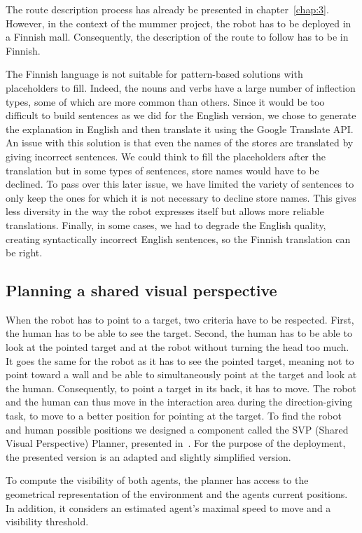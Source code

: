 The route description process has already be presented in chapter~\ref{chap:3}. However, in the context of the \acrshort{mummer} project, the robot has to be deployed in a Finnish mall. Consequently, the description of the route to follow has to be in Finnish.

The Finnish language is not suitable for pattern-based solutions with placeholders to fill. Indeed, the nouns and verbs have a large number of inflection types, some of which are more common than others. Since it would be too difficult to build sentences as we did for the English version, we chose to generate the explanation in English and then translate it using the Google Translate API. An issue with this solution is that even the names of the stores are translated by giving incorrect sentences. We could think to fill the placeholders after the translation but in some types of sentences, store names would have to be declined. To pass over this later issue, we have limited the variety of sentences to only keep the ones for which it is not necessary to decline store names. This gives less diversity in the way the robot expresses itself but allows more reliable translations. Finally, in some cases, we had to degrade the English quality, creating syntactically incorrect English sentences, so the Finnish translation can be right.

\subsection{Planning a shared visual perspective}

When the robot has to point to a target, two criteria have to be respected. First, the human has to be able to see the target. Second, the human has to be able to look at the pointed target and at the robot without turning the head too much. It goes the same for the robot as it has to see the pointed target, meaning not to point toward a wall and be able to simultaneously point at the target and look at the human. Consequently, to point a target in its back, it has to move. The robot and the human can thus move in the interaction area during the direction-giving task, to move to a better position for pointing at the target. To find the robot and human possible positions we designed a component called the SVP (Shared Visual Perspective) Planner, presented in~\cite{waldhart_2019_reasoning}. For the purpose of the deployment, the presented version is an adapted and slightly simplified version.

To compute the visibility of both agents, the planner has access to the geometrical representation of the environment and the agents current positions. In addition, it considers an estimated agent's maximal speed to move and a visibility threshold.

